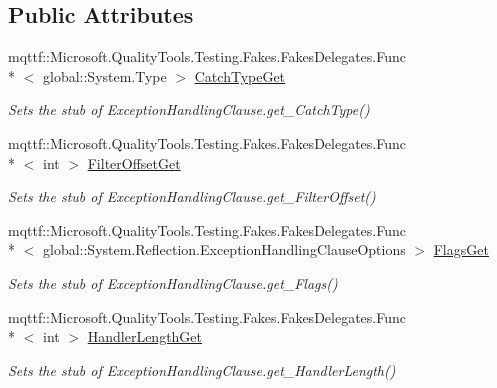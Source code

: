 \subsection*{Public Attributes}
\begin{DoxyCompactItemize}
\item 
mqttf\-::\-Microsoft.\-Quality\-Tools.\-Testing.\-Fakes.\-Fakes\-Delegates.\-Func\\*
$<$ global\-::\-System.\-Type $>$ \hyperlink{class_system_1_1_reflection_1_1_fakes_1_1_stub_exception_handling_clause_a5d1c643be4992aebdebae094e8f175b2}{Catch\-Type\-Get}
\begin{DoxyCompactList}\small\item\em Sets the stub of Exception\-Handling\-Clause.\-get\-\_\-\-Catch\-Type()\end{DoxyCompactList}\item 
mqttf\-::\-Microsoft.\-Quality\-Tools.\-Testing.\-Fakes.\-Fakes\-Delegates.\-Func\\*
$<$ int $>$ \hyperlink{class_system_1_1_reflection_1_1_fakes_1_1_stub_exception_handling_clause_a54d98f2c32cfd5d7f779d7df0cec2454}{Filter\-Offset\-Get}
\begin{DoxyCompactList}\small\item\em Sets the stub of Exception\-Handling\-Clause.\-get\-\_\-\-Filter\-Offset()\end{DoxyCompactList}\item 
mqttf\-::\-Microsoft.\-Quality\-Tools.\-Testing.\-Fakes.\-Fakes\-Delegates.\-Func\\*
$<$ global\-::\-System.\-Reflection.\-Exception\-Handling\-Clause\-Options $>$ \hyperlink{class_system_1_1_reflection_1_1_fakes_1_1_stub_exception_handling_clause_acb376e8e3c8bc31da5ac240b1f4ed66d}{Flags\-Get}
\begin{DoxyCompactList}\small\item\em Sets the stub of Exception\-Handling\-Clause.\-get\-\_\-\-Flags()\end{DoxyCompactList}\item 
mqttf\-::\-Microsoft.\-Quality\-Tools.\-Testing.\-Fakes.\-Fakes\-Delegates.\-Func\\*
$<$ int $>$ \hyperlink{class_system_1_1_reflection_1_1_fakes_1_1_stub_exception_handling_clause_a90fd5fcefeeffe8b83388a15e2caecc0}{Handler\-Length\-Get}
\begin{DoxyCompactList}\small\item\em Sets the stub of Exception\-Handling\-Clause.\-get\-\_\-\-Handler\-Length()\end{DoxyCompactList}\item 

\end{DoxyCompactItemize}
